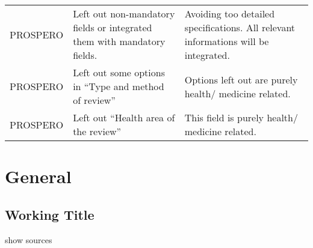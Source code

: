 \documentclass[
]{article}
\begin{document}
\begin{collapse}
\begin{longtable}[]{@{}lll@{}}
\begin{minipage}[t]{0.15\columnwidth}\raggedright
PROSPERO\strut
\end{minipage} & \begin{minipage}[t]{0.33\columnwidth}\raggedright
Left out non-mandatory fields or integrated them with mandatory
fields.\strut
\end{minipage} & \begin{minipage}[t]{0.43\columnwidth}\raggedright
Avoiding too detailed specifications. All relevant informations will be
integrated.\strut
\end{minipage}\tabularnewline
\begin{minipage}[t]{0.15\columnwidth}\raggedright
PROSPERO\strut
\end{minipage} & \begin{minipage}[t]{0.33\columnwidth}\raggedright
Left out some options in ``Type and method of review''\strut
\end{minipage} & \begin{minipage}[t]{0.43\columnwidth}\raggedright
Options left out are purely health/ medicine related.\strut
\end{minipage}\tabularnewline
\begin{minipage}[t]{0.15\columnwidth}\raggedright
PROSPERO\strut
\end{minipage} & \begin{minipage}[t]{0.33\columnwidth}\raggedright
Left out ``Health area of the review''\strut
\end{minipage} & \begin{minipage}[t]{0.43\columnwidth}\raggedright
This field is purely health/ medicine related.\strut
\end{minipage}\tabularnewline
\bottomrule
\end{longtable}

\end{collapse}

\hypertarget{general}{%
\section{General}\label{general}}

\hypertarget{working-title}{%
\subsection{Working Title}\label{working-title}}

show sources
\end{document}
